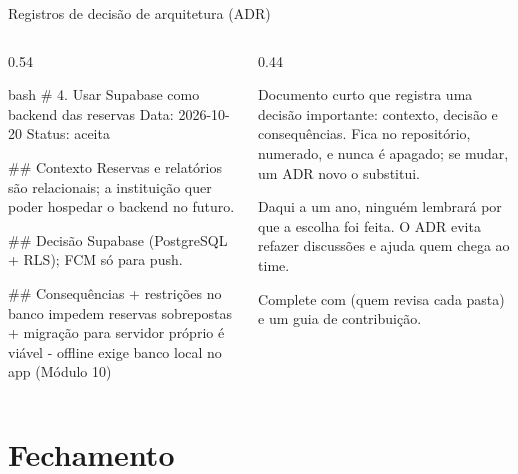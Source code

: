 \documentclass[aspectratio=169,10pt]{beamer}
\begin{document}
\begin{frame}[fragile]{Registros de decisão de arquitetura (ADR)}
  \begin{columns}[T]
    \begin{column}{0.54\textwidth}
\begin{codigo}[title=docs/adr/0004-backend-supabase.md]{bash}
# 4. Usar Supabase como backend das reservas
Data: 2026-10-20   Status: aceita

## Contexto
Reservas e relatórios são relacionais; a instituição
quer poder hospedar o backend no futuro.

## Decisão
Supabase (PostgreSQL + RLS); FCM só para push.

## Consequências
+ restrições no banco impedem reservas sobrepostas
+ migração para servidor próprio é viável
- offline exige banco local no app (Módulo 10)
\end{codigo}
    \end{column}
    \begin{column}{0.44\textwidth}
      \begin{definicao}[ADR]
        Documento curto que registra uma decisão importante: contexto, decisão e consequências. Fica no repositório, numerado, e nunca é apagado; se mudar, um ADR novo o substitui.
      \end{definicao}
      \begin{conceito}
        Daqui a um ano, ninguém lembrará por que a escolha foi feita. O ADR evita refazer discussões e ajuda quem chega ao time.
      \end{conceito}
      \begin{dica}
        Complete com  (quem revisa cada pasta) e um guia de contribuição.
      \end{dica}
    \end{column}
  \end{columns}
\end{frame}

\section{Fechamento}
\end{document}
